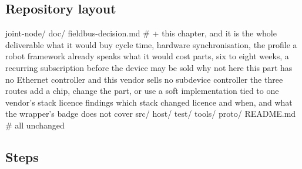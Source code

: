\subsection*{Repository layout}

\begin{plaincode}
joint-node/
  doc/
    fieldbus-decision.md      # + this chapter, and it is the whole deliverable
      what it would buy         cycle time, hardware synchronisation, the
                                profile a robot framework already speaks
      what it would cost        parts, six to eight weeks, a recurring
                                subscription before the device may be sold
      why not here              this part has no Ethernet controller and this
                                vendor sells no subdevice controller
      the three routes          add a chip, change the part, or use a soft
                                implementation tied to one vendor's stack
      licence findings          which stack changed licence and when, and
                                what the wrapper's badge does not cover
  src/  host/  test/  tools/  proto/  README.md      # all unchanged
\end{plaincode}

\subsection*{Steps}

